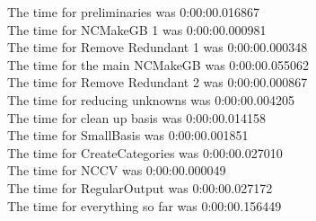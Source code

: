 \documentclass[rep10,leqno]{report}
\begin{document}
\noindent
The time for preliminaries was 0:00:00.016867\\
The time for NCMakeGB 1 was 0:00:00.000981\\
The time for Remove Redundant 1 was 0:00:00.000348\\
The time for the main NCMakeGB was 0:00:00.055062\\
The time for Remove Redundant 2 was 0:00:00.000867\\
The time for reducing unknowns was 0:00:00.004205\\
The time for clean up basis was 0:00:00.014158\\
The time for SmallBasis was 0:00:00.001851\\
The time for CreateCategories was 0:00:00.027010\\
The time for NCCV was 0:00:00.000049\\
The time for RegularOutput was 0:00:00.027172\\
The time for everything so far was 0:00:00.156449\\
\end{document}
